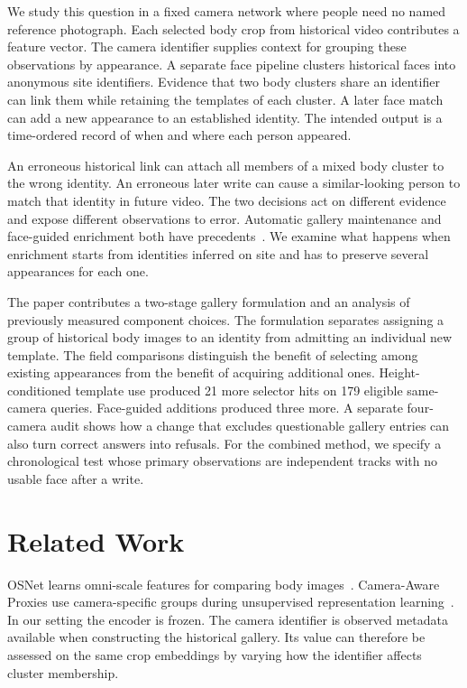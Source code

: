 \documentclass[journal,letterpaper]{IEEEtran}
\begin{document}
We study this question in a fixed camera network where people need no named reference photograph. Each selected body crop from historical video contributes a feature vector. The camera identifier supplies context for grouping these observations by appearance. A separate face pipeline clusters historical faces into anonymous site identifiers. Evidence that two body clusters share an identifier can link them while retaining the templates of each cluster. A later face match can add a new appearance to an established identity. The intended output is a time-ordered record of when and where each person appeared.

An erroneous historical link can attach all members of a mixed body cluster to the wrong identity. An erroneous later write can cause a similar-looking person to match that identity in future video. The two decisions act on different evidence and expose different observations to error. Automatic gallery maintenance and face-guided enrichment both have precedents~\cite{geff,casao}. We examine what happens when enrichment starts from identities inferred on site and has to preserve several appearances for each one.

The paper contributes a two-stage gallery formulation and an analysis of previously measured component choices. The formulation separates assigning a group of historical body images to an identity from admitting an individual new template. The field comparisons distinguish the benefit of selecting among existing appearances from the benefit of acquiring additional ones. Height-conditioned template use produced 21 more selector hits on 179 eligible same-camera queries. Face-guided additions produced three more. A separate four-camera audit shows how a change that excludes questionable gallery entries can also turn correct answers into refusals. For the combined method, we specify a chronological test whose primary observations are independent tracks with no usable face after a write.

\section{Related Work}\label{sec:related}
OSNet learns omni-scale features for comparing body images~\cite{osnet}. Camera-Aware Proxies use camera-specific groups during unsupervised representation learning~\cite{cap}. In our setting the encoder is frozen. The camera identifier is observed metadata available when constructing the historical gallery. Its value can therefore be assessed on the same crop embeddings by varying how the identifier affects cluster membership.
\end{document}
